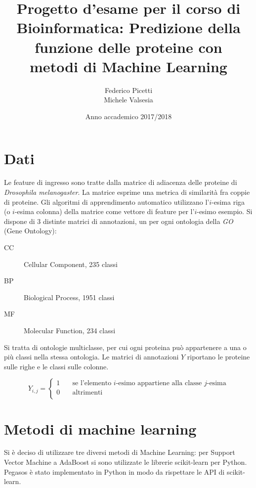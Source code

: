 \documentclass[12pt,a4paper,oneside,hidelinks]{report}
\begin{document}

\title{%
  	   Progetto d’esame per il corso di Bioinformatica: 
	   Predizione della funzione delle proteine con \\     
       metodi di Machine Learning}
  
\author{Federico Picetti \\
		Michele Valsesia}

\date{Anno accademico 2017/2018} 

\maketitle

\tableofcontents



\chapter{Dati}
Le feature di ingresso sono tratte dalla matrice di adiacenza delle proteine di \emph{Drosophila melanogaster}. La matrice esprime una metrica di similarità fra coppie di proteine.
Gli algoritmi di apprendimento automatico utilizzano l'$ i $-esima riga (o $ i $-esima colonna) della matrice come vettore di feature per l'$ i $-esimo esempio.
Si dispone di 3 distinte matrici di annotazioni, un per ogni ontologia della \emph{GO} (Gene Ontology):
\begin{description}
\item[CC]Cellular Component, 235 classi
\item[BP]Biological Process, 1951 classi
\item[MF]Molecular Function, 234 classi
\end{description}
Si tratta di ontologie multiclasse, per cui ogni proteina può appartenere a una o più classi nella stessa ontologia.
Le matrici di annotazioni $ Y $ riportano le proteine sulle righe e le classi sulle colonne. 

\[ Y_{i,j} =
  \begin{cases}
    1       & \quad \text{se l'elemento } i \text{-esimo appartiene alla classe } j \text{-esima}\\
    0  & \quad \text{altrimenti}\\
  \end{cases}
\]




\chapter{Metodi di machine learning}
Si è deciso di utilizzare tre diversi metodi di Machine Learning: per Support Vector Machine a AdaBoost si sono utilizzate le librerie scikit-learn per Python.
Pegasos è stato implementato in Python in modo da rispettare le API di scikit-learn.
\end{document}
